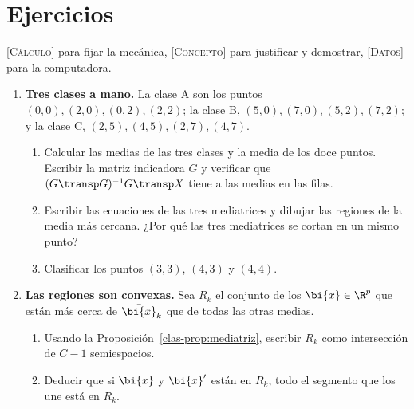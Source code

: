 \section*{Ejercicios}

\noindent\footnotesize \textsc{[Cálculo]} para fijar la mecánica,
\textsc{[Concepto]} para justificar y demostrar, \textsc{[Datos]} para la
computadora.\normalsize

\begin{enumerate}[leftmargin=*,label=\textbf{\thechapter.\arabic*},ref=\thechapter.\arabic*,itemsep=4pt]

\item {} \textbf{Tres clases a mano.}\label{clas-ej:tres} La clase
A son los puntos $(0,0),(2,0),(0,2),(2,2)$; la clase B, $(5,0),(7,0),(5,2),(7,2)$;
y la clase C, $(2,5),(4,5),(2,7),(4,7)$.
\begin{enumerate}[label=(\alph*)]
\item Calcular las medias de las tres clases y la media de los doce puntos.
Escribir la matriz indicadora $G$ y verificar que $(G\transp G)^{-1}G\transp X$
tiene a las medias en las filas.
\item Escribir las ecuaciones de las tres mediatrices y dibujar las regiones
de la media más cercana. ¿Por qué las tres mediatrices se cortan en un mismo
punto?
\item Clasificar los puntos $(3,3)$, $(4,3)$ y $(4,4)$.
\end{enumerate}

\item {} \textbf{Las regiones son convexas.}\label{clas-ej:convexas}
Sea $R_k$ el conjunto de los $\bi{x}\in\R^p$ que están más cerca de $\bar{\bi{x}}_k$ que
de todas las otras medias.
\begin{enumerate}[label=(\alph*)]
\item Usando la Proposición~\ref{clas-prop:mediatriz}, escribir $R_k$ como
intersección de $C-1$ semiespacios.
\item Deducir que si $\bi{x}$ y $\bi{x}'$ están en $R_k$, todo el segmento que los une
está en $R_k$.
\end{enumerate}


\end{enumerate}

